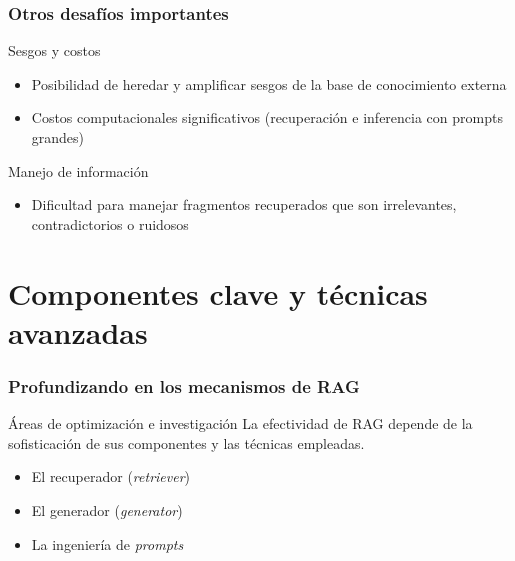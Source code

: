 \documentclass[handout]{beamer}
\begin{document}
\begin{frame}
  \frametitle{Otros desafíos importantes}
  \begin{block}{Sesgos y costos}
    \begin{itemize}
        \item Posibilidad de heredar y amplificar sesgos de la base de conocimiento externa
        \item Costos computacionales significativos (recuperación e inferencia con prompts grandes)
    \end{itemize}
  \end{block}
   \begin{alertblock}{Manejo de información}
    \begin{itemize}
        \item Dificultad para manejar fragmentos recuperados que son irrelevantes, contradictorios o ruidosos
    \end{itemize}
  \end{alertblock}
\end{frame}

\section{Componentes clave y técnicas avanzadas}
\begin{frame}
  \frametitle{Profundizando en los mecanismos de RAG}
    \begin{block}{Áreas de optimización e investigación}
        La efectividad de RAG depende de la sofisticación de sus componentes y las técnicas empleadas.
        \begin{itemize}
            \item El recuperador (\textit{retriever})
            \item El generador (\textit{generator})
            \item La ingeniería de \textit{prompts}
        \end{itemize}
    \end{block}
\end{frame}

\end{document}
